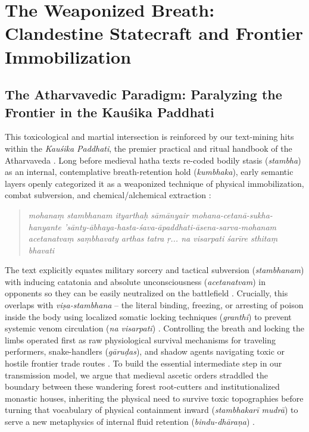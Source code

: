 \documentclass[11pt,twoside,letterpaper]{article}
\begin{document}

\section{The Weaponized Breath: Clandestine Statecraft and Frontier Immobilization}

\subsection{The Atharvavedic Paradigm: Paralyzing the Frontier in the Kauśika Paddhati}
This toxicological and martial intersection is reinforced by our text-mining hits within the \textit{Kauśika Paddhati}, the premier practical and ritual handbook of the Atharvaveda \citep{KausP}. Long before medieval hatha texts re-coded bodily stasis (\textit{stambha}) as an internal, contemplative breath-retention hold (\textit{kumbhaka}), early semantic layers openly categorized it as a weaponized technique of physical immobilization, combat subversion, and chemical/alchemical extraction \citep{Birch2024, KausP}:

\begin{quote}
\textit{mohanaṃ stambhanam ityarthaḥ sāmānyair mohana-cetanā-sukha-hanyante 'sānty-ābhaya-hasta-śava-āpaddhati-āsena-sarva-mohanam acetanatvaṃ saṃbhavaty arthas tatra ṛ... na visarpati śarīre sthitaṃ bhavati }
\end{quote}

The text explicitly equates military sorcery and tactical subversion (\textit{stambhanam}) with inducing catatonia and absolute unconsciousness (\textit{acetanatvam}) in opponents so they can be easily neutralized on the battlefield \citep{KausP}. Crucially, this overlaps with \textit{viṣa-stambhana} – the literal binding, freezing, or arresting of poison inside the body using localized somatic locking techniques (\textit{granthi}) to prevent systemic venom circulation (\textit{na visarpati}) \citep{KausP}. Controlling the breath and locking the limbs operated first as raw physiological survival mechanisms for traveling performers, snake-handlers (\textit{gāruḍas}), and shadow agents navigating toxic or hostile frontier trade routes \citep{Birch2024}. To build the essential intermediate step in our transmission model, we argue that medieval ascetic orders straddled the boundary between these wandering forest root-cutters and institutionalized monastic houses, inheriting the physical need to survive toxic topographies before turning that vocabulary of physical containment inward (\textit{stambhakarī mudrā}) to serve a new metaphysics of internal fluid retention (\textit{bindu-dhāraṇa}) \citep{Birch2024}.
\end{document}

